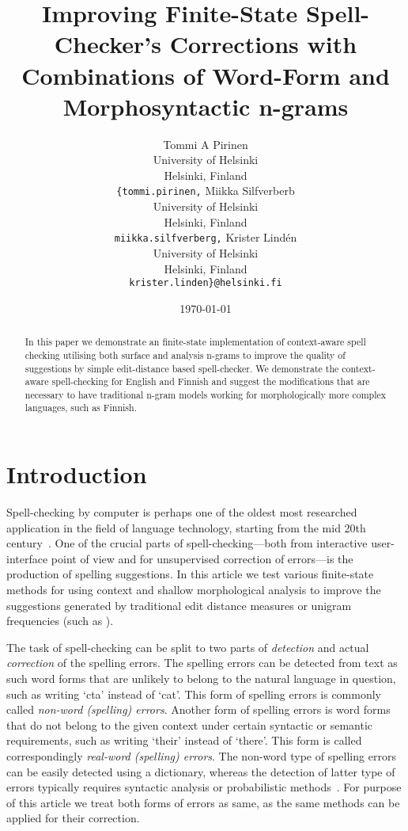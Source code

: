 \documentclass[11pt,a4paper]{article}
\title{Improving Finite-State Spell-Checker's Corrections with Combinations of Word-Form and Morphosyntactic n-grams}
\author{Tommi A Pirinen\\
  University of Helsinki\\
  Helsinki, Finland\\
  {\tt \{tommi.pirinen,} \And
  Miikka Silfverberb\\
  University of Helsinki\\
  Helsinki, Finland\\
  {\tt miikka.silfverberg,} \And
  Krister Lind\'{e}n\\
  University of Helsinki\\
  Helsinki, Finland\\
  {\tt krister.linden\}@helsinki.fi}
}
\date{\today}
\begin{document}
\maketitle
\begin{abstract}
  In this paper we demonstrate an finite-state implementation of context-aware
  spell checking utilising both surface and analysis n-grams to improve the
  quality of suggestions by simple edit-distance based spell-checker. We
  demonstrate the context-aware spell-checking for English and Finnish and
  suggest the modifications that are necessary to have traditional n-gram
  models working for morphologically more complex languages, such as Finnish.
\end{abstract}

\section{Introduction}

Spell-checking by computer is perhaps one of the oldest most researched
application in the field of language technology, starting from the mid 20th
century~\cite{damerau/1964}. One of the crucial parts of spell-checking---both
from interactive user-interface point of view and for unsupervised correction
of errors---is the production of spelling suggestions.  In this article we test
various finite-state methods for using context and shallow morphological
analysis to improve the suggestions generated by traditional edit distance
measures or unigram frequencies (such as ).

The task of spell-checking can be split to two parts of \emph{detection} and
actual \emph{correction} of the spelling errors. The spelling errors can be
detected from text as such word forms that are unlikely to belong to the
natural language in question, such as writing `cta' instead of `cat'. This form
of spelling errors is commonly called \emph{non-word (spelling) errors}.
Another form of spelling errors is word forms that do not belong to the given
context under certain syntactic or semantic requirements, such as writing
`their' instead of `there'. This form is called correspondingly \emph{real-word
(spelling) errors}. The non-word type of spelling errors can be easily detected
using a dictionary, whereas the detection of latter type of errors typically
requires syntactic analysis or probabilistic methods~\cite{mitton/2009}. For
purpose of this article we treat both forms of errors as same, as the same
methods can be applied for their correction.
\end{document}
